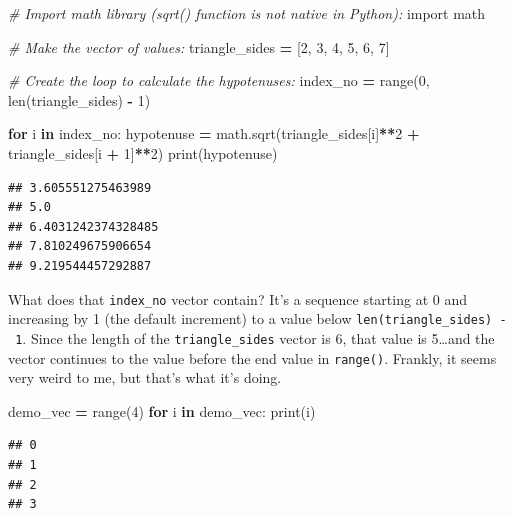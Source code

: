 \documentclass[
]{book}
\newenvironment{Shaded}{\begin{snugshade}}{\end{snugshade}}
\newcommand{\BuiltInTok}[1]{#1}
\newcommand{\CommentTok}[1]{\textcolor[rgb]{0.56,0.35,0.01}{\textit{#1}}}
\newcommand{\ControlFlowTok}[1]{\textcolor[rgb]{0.13,0.29,0.53}{\textbf{#1}}}
\newcommand{\DecValTok}[1]{\textcolor[rgb]{0.00,0.00,0.81}{#1}}
\newcommand{\ImportTok}[1]{#1}
\newcommand{\KeywordTok}[1]{\textcolor[rgb]{0.13,0.29,0.53}{\textbf{#1}}}
\newcommand{\NormalTok}[1]{#1}
\newcommand{\OperatorTok}[1]{\textcolor[rgb]{0.81,0.36,0.00}{\textbf{#1}}}
\begin{document}
\begin{Shaded}
\begin{Highlighting}[]
\CommentTok{\# Import math library (sqrt() function is not native in Python):}
\ImportTok{import}\NormalTok{ math}

\CommentTok{\# Make the vector of values:}
\NormalTok{triangle\_sides }\OperatorTok{=}\NormalTok{ [}\DecValTok{2}\NormalTok{, }\DecValTok{3}\NormalTok{, }\DecValTok{4}\NormalTok{, }\DecValTok{5}\NormalTok{, }\DecValTok{6}\NormalTok{, }\DecValTok{7}\NormalTok{]}

\CommentTok{\# Create the loop to calculate the hypotenuses: }
\NormalTok{index\_no }\OperatorTok{=} \BuiltInTok{range}\NormalTok{(}\DecValTok{0}\NormalTok{, }\BuiltInTok{len}\NormalTok{(triangle\_sides) }\OperatorTok{{-}} \DecValTok{1}\NormalTok{)}

\ControlFlowTok{for}\NormalTok{ i }\KeywordTok{in}\NormalTok{ index\_no:}
\NormalTok{  hypotenuse }\OperatorTok{=}\NormalTok{ math.sqrt(triangle\_sides[i]}\OperatorTok{**}\DecValTok{2} \OperatorTok{+}\NormalTok{ triangle\_sides[i }\OperatorTok{+} \DecValTok{1}\NormalTok{]}\OperatorTok{**}\DecValTok{2}\NormalTok{)}
  \BuiltInTok{print}\NormalTok{(hypotenuse)}
\end{Highlighting}
\end{Shaded}

\begin{verbatim}
## 3.605551275463989
## 5.0
## 6.4031242374328485
## 7.810249675906654
## 9.219544457292887
\end{verbatim}

What does that \texttt{index\_no} vector contain? It's a sequence starting at 0 and increasing by 1 (the default increment) to a value below \texttt{len(triangle\_sides)\ -\ 1}. Since the length of the \texttt{triangle\_sides} vector is 6, that value is 5\ldots and the vector continues to the value before the end value in \texttt{range()}. Frankly, it seems very weird to me, but that's what it's doing.

\begin{Shaded}
\begin{Highlighting}[]
\NormalTok{demo\_vec }\OperatorTok{=} \BuiltInTok{range}\NormalTok{(}\DecValTok{4}\NormalTok{)}
\ControlFlowTok{for}\NormalTok{ i }\KeywordTok{in}\NormalTok{ demo\_vec:}
  \BuiltInTok{print}\NormalTok{(i)}
\end{Highlighting}
\end{Shaded}

\begin{verbatim}
## 0
## 1
## 2
## 3
\end{verbatim}
\end{document}
